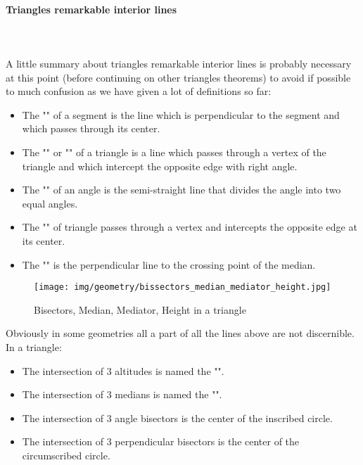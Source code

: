 	\paragraph{Triangles remarkable interior lines}\label{triangles remarkable interior lines}\mbox{}\\\\
	A little summary about triangles remarkable interior lines is probably necessary at this point (before continuing on other triangles theorems) to avoid if possible to much confusion as we have given a lot of definitions so far:
	\begin{itemize}
		\item The "" of a segment is the line which is perpendicular to the segment and which passes through its center.

		\item The "" or ""  of a triangle is a line which passes through a vertex of the triangle and which intercept the opposite edge with right angle.

		\item The "" of an angle is the semi-straight line that divides the angle into two equal angles.

		\item The "" of triangle passes through a vertex and intercepts the opposite edge at its center.

		\item The "" is the perpendicular line to the crossing point of the median.
	\end{itemize}
	\begin{figure}[H]
		\centering
		\texttt{[image: img/geometry/bissectors\_median\_mediator\_height.jpg]}
		\caption{Bisectors, Median, Mediator, Height in a triangle}
	\end{figure}
	Obviously in some geometries all a part of all the lines above are not discernible.
	In a triangle:
	\begin{itemize}
		\item The intersection of $3$ altitudes is named the "".
		\item The intersection of $3$ medians is named the "".
		\item The intersection of $3$ angle bisectors is the center of the inscribed circle.
		\item The intersection of $3$ perpendicular bisectors is the center of the circumscribed circle.
	\end{itemize}
	
